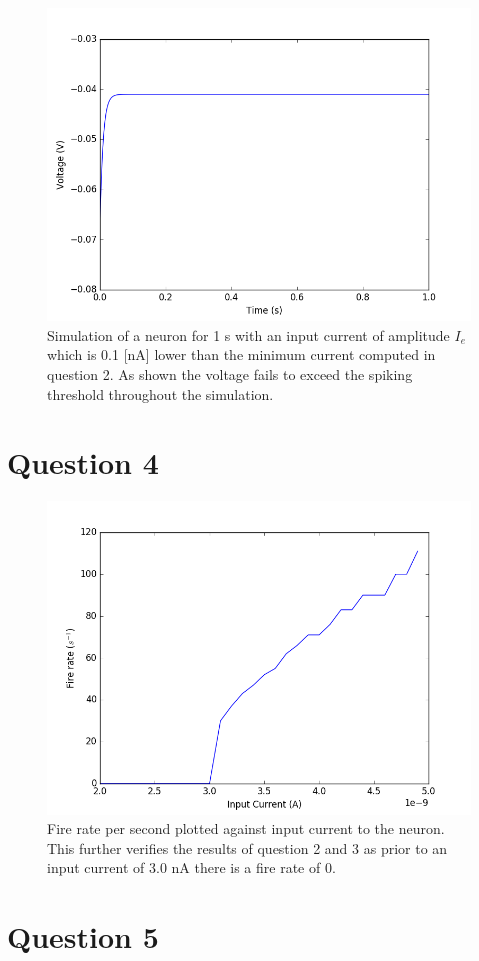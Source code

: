\documentclass[12pt, a4paper]{article}
\begin{document}
\begin{figure}[H]
  \centering
  \includegraphics[width=0.5\linewidth]{figures/q3}
  \caption{Simulation of a neuron for 1 s with an input current of amplitude $I_e$ which is 0.1 [nA] lower than the minimum current computed in question 2. As shown the voltage fails to exceed the spiking threshold throughout the simulation.}
\end{figure}

\section*{Question 4}

\begin{figure}[H]
  \centering
  \includegraphics[width=0.5\linewidth]{figures/q4}
  \caption{Fire rate per second plotted against input current to the neuron. This further verifies the results of question 2 and 3 as prior to an input current of 3.0 nA there is a fire rate of 0.}
\end{figure}

\section*{Question 5}
\end{document}
